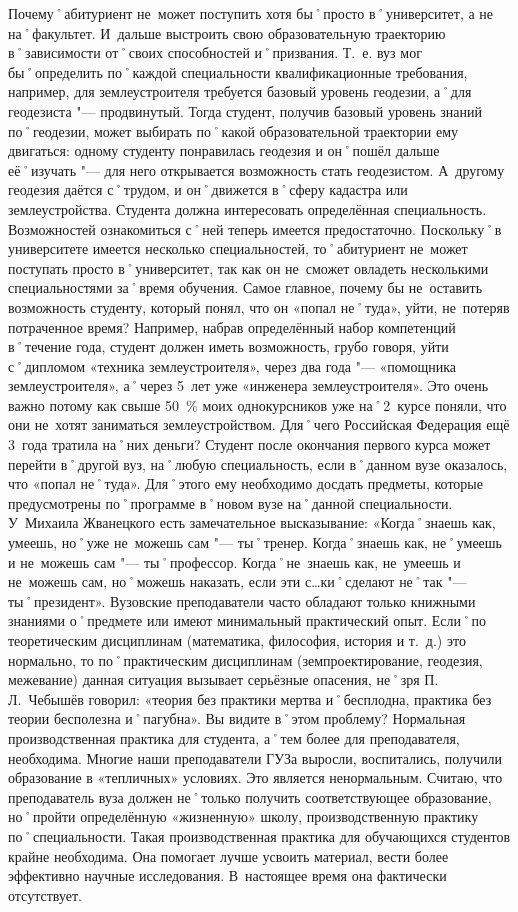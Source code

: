 \begin{drama}
	\maxspeaks Почему˚абитуриент не~может поступить хотя бы˚просто в˚университет, а не на˚факультет. И~дальше выстроить свою образовательную траекторию в˚зависимости от˚своих способностей и˚призвания. Т.~е. вуз мог бы˚определить по˚каждой специальности квалификационные требования, например, для землеустроителя требуется базовый уровень геодезии, а˚для геодезиста "--- продвинутый. Тогда студент, получив базовый уровень знаний по˚геодезии, может выбирать по˚какой образовательной траектории ему двигаться: одному студенту понравилась геодезия и он˚пошёл дальше её˚изучать "--- для него открывается возможность стать геодезистом. А~другому геодезия даётся с˚трудом, и он˚движется в˚сферу кадастра или землеустройства. 
	\michaelspeaks Студента должна интересовать определённая специальность. Возможностей ознакомиться с˚ней теперь имеется предостаточно. Поскольку˚в университете имеется несколько специальностей, то˚абитуриент не~может поступать просто в˚университет, так как он не~сможет овладеть несколькими специальностями за˚время обучения.
	\maxspeaks Самое главное, почему бы не~оставить возможность студенту, который понял, что он  «попал не˚туда», уйти, не~потеряв потраченное время? Например, набрав определённый набор компетенций в˚течение года, студент должен иметь возможность, грубо говоря, уйти с˚дипломом  «техника землеустроителя», через два года "---  «помощника землеустроителя», а˚через 5~лет уже  «инженера землеустроителя». Это очень важно потому как свыше 50~\% моих однокурсников уже на˚2~курсе поняли, что они не~хотят заниматься землеустройством. Для˚чего Российская Федерация ещё 3~года тратила на˚них деньги?
	\michaelspeaks Студент после окончания первого курса может перейти в˚другой вуз, на˚любую специальность, если в˚данном вузе оказалось, что «попал не˚туда». Для˚этого ему необходимо досдать предметы, которые предусмотрены по˚программе в˚новом вузе на˚данной специальности.
	\maxspeaks У~Михаила Жванецкого есть замечательное высказывание:  «Когда˚знаешь как, умеешь, но˚уже не~можешь сам "--- ты˚тренер. Когда˚знаешь как, не˚умеешь и не~можешь сам "--- ты˚профессор. Когда˚не~знаешь как, не~умеешь и не~можешь сам, но˚можешь наказать, если эти с…ки˚сделают не˚так "--- ты˚президент». Вузовские преподаватели часто обладают только книжными знаниями о˚предмете или имеют минимальный практический опыт. Если˚по теоретическим дисциплинам (математика, философия, история и т.~д.) это нормально, то по˚практическим дисциплинам (земпроектирование, геодезия, межевание) данная ситуация вызывает серьёзные опасения, не˚зря П.\,Л.~Чебышёв говорил:  «теория без практики мертва и˚бесплодна, практика без теории бесполезна и˚пагубна». Вы видите в˚этом проблему?
	\michaelspeaks Нормальная производственная практика для студента, а˚тем более для преподавателя, необходима. Многие наши преподаватели ГУЗа выросли, воспитались, получили образование в «тепличных» условиях. Это является ненормальным. Считаю, что преподаватель вуза должен не˚только получить соответствующее образование, но˚пройти определённую «жизненную» школу, производственную практику по˚специальности. Такая производственная практика для обучающихся студентов крайне необходима. Она помогает лучше усвоить материал, вести более эффективно научные исследования. В~настоящее время она фактически отсутствует.
	

\end{drama}
